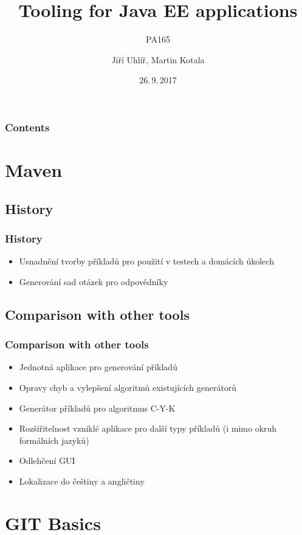 \documentclass[pdf,compress]{beamer}
\title{Tooling for Java EE applications}
\subtitle{PA165}
\date{26.\,9.\,2017}
\author{Jiří Uhlíř, Martin Kotala}
\begin{document}
\frame{\titlepage}

\section[]{}
\begin{frame}
\frametitle{Contents}
\tableofcontents
\end{frame}


\section[Maven]{Maven}
\subsection[]{History}
\begin{frame}
\frametitle{History}
\begin{itemize}
\item Usnadnění tvorby příkladů pro použití v testech a domácích úkolech
\item Generování sad otázek pro odpovědníky
\end{itemize}
\end{frame}

\subsection[]{Comparison with other tools}
\begin{frame}
\frametitle{Comparison with other tools}
\begin{itemize}
\item Jednotná aplikace pro generování příkladů
\item Opravy chyb a vylepšení algoritmů existujících generátorů \pause
\item Generátor příkladů pro algoritmus C-Y-K \pause
\item Rozšiřitelnost vzniklé aplikace pro další typy příkladů (i mimo okruh formálních jazyků) \pause
\item Odlehčení GUI \pause
\item Lokalizace do češtiny a angličtiny
\end{itemize}

\end{frame}

\section[GIT Basics]{GIT Basics}
\end{document}
